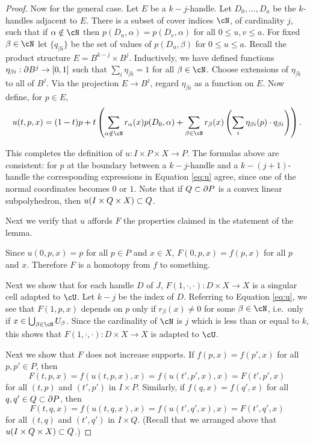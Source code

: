 \begin{proof}
Now for the general case.
Let $E$ be a $k{-}j$-handle.
Let $D_0,\ldots,D_a$ be the $k$-handles adjacent to $E$.
There is a subset of cover indices $\cN$, of cardinality $j$, 
such that if $\alpha\notin\cN$ then
$p(D_u, \alpha) = p(D_v, \alpha)$ for all $0\le u,v \le a$.
For fixed $\beta\in\cN$ let $\{q_{\beta i}\}$ be the set of values of 
$p(D_u, \beta)$ for $0\le u \le a$.
Recall the product structure $E = B^{k-j}\times B^j$.
Inductively, we have defined functions $\eta_{\beta i}:\partial B^j \to [0,1]$ such that
$\sum_i \eta_{\beta i} = 1$ for all $\beta\in \cN$.
Choose extensions of $\eta_{\beta i}$ to all of $B^j$.
Via the projection $E\to B^j$, regard $\eta_{\beta i}$ as a function on $E$.
Now define, for $p \in E$,
\begin{equation}
\label{eq:u}
    u(t, p, x) = (1-t)p + t \left(
            \sum_{\alpha \notin \cN} r_\alpha(x) p(D_0, \alpha)
                + \sum_{\beta \in \cN} r_\beta(x) \left( \sum_i \eta_{\beta i}(p) \cdot q_{\beta i} \right)
             \right) .
\end{equation}

This completes the definition of $u: I \times P \times X \to P$. The formulas above are consistent: for $p$ at the boundary between a $k-j$-handle and a $k-(j+1)$-handle the corresponding expressions in Equation \eqref{eq:u} agree, since one of the normal coordinates becomes $0$ or $1$. 
Note that if $Q\subset \partial P$ is a convex linear subpolyhedron, then $u(I\times Q\times X) \subset Q$.

\medskip

Next we verify that $u$ affords $F$ the properties claimed in the statement of the lemma.

Since $u(0, p, x) = p$ for all $p\in P$ and $x\in X$, $F(0, p, x) = f(p, x)$ for all $p$ and $x$.
Therefore $F$ is a homotopy from $f$ to something.


\medskip

Next we show that for each handle $D$ of $J$, $F(1, \cdot, \cdot) : D\times X \to X$
is a singular cell adapted to $\cU$.
Let $k-j$ be the index of $D$.
Referring to Equation \eqref{eq:u}, we see that $F(1, p, x)$ depends on $p$ only if 
$r_\beta(x) \ne 0$ for some $\beta\in\cN$, i.e.\ only if
$x\in \bigcup_{\beta\in\cN} U_\beta$.
Since the cardinality of $\cN$ is $j$ which is less than or equal to $k$,
this shows that $F(1, \cdot, \cdot) : D\times X \to X$ is adapted to $\cU$.

\medskip

Next we show that $F$ does not increase supports.
If $f(p,x) = f(p',x)$ for all $p,p'\in P$,
then 
\[
	F(t, p, x) = f(u(t,p,x),x) = f(u(t',p',x),x) = F(t',p',x)
\]
for all $(t,p)$ and $(t',p')$ in $I\times P$.
Similarly, if $f(q,x) = f(q',x)$ for all $q,q'\in Q\subset \partial P$,
then 
\[
	F(t, q, x) = f(u(t,q,x),x) = f(u(t',q',x),x) = F(t',q',x)
\]
for all $(t,q)$ and $(t',q')$ in $I\times Q$.
(Recall that we arranged above that $u(I\times Q\times X) \subset Q$.)


\end{proof}
